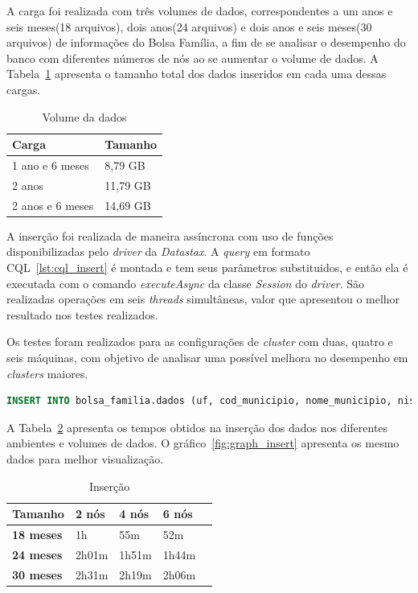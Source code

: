 A carga foi realizada com três volumes de dados, correspondentes a um anos e seis meses(18 arquivos), dois anos(24 arquivos) e dois anos e seis meses(30 arquivos) de informações do Bolsa Família, a fim de se analisar o desempenho do banco com diferentes números de nós ao se aumentar o volume de dados. A Tabela~\ref{tab:volume} apresenta o tamanho total dos dados inseridos em cada uma dessas cargas.

\begin{table}[]
	\centering
	\caption{Volume da dados}
	\label{tab:volume}
	\begin{tabular}{ll}
		\textbf{Carga} & \textbf{Tamanho} \\ \hline
		1 ano e 6 meses     &  8,79 GB              \\ \hline
		2 anos          	&  11,79 GB             \\ \hline
		2 anos e 6 meses    &  14,69 GB             \\ \hline
	\end{tabular}
\end{table}

A inserção foi realizada de maneira assíncrona com uso de funções disponibilizadas pelo \emph{driver} da \emph{Datastax}. A \emph{query} em formato CQL~\ref{lst:cql_insert} é montada e tem seus parâmetros substituidos, e então ela é executada com o comando \emph{executeAsync} da classe \emph{Session} do \emph{driver}. São realizadas operações em seis \emph{threads} simultâneas, valor que apresentou o melhor resultado nos testes realizados.

Os testes foram realizados para as configurações de \emph{cluster} com duas, quatro e seis máquinas, com objetivo de analisar uma possível melhora no desempenho em \emph{clusters} maiores.

\begin{lstlisting}[caption={Código CQL para inserção},label={lst:cql_insert},language=SQL]
INSERT INTO bolsa_familia.dados (uf, cod_municipio, nome_municipio, nis_favorecido, nome_favorecido, fonte, valor, periodo) VALUES (?, ?, ?, ?, ?, ?, ?, ?)
\end{lstlisting}

A Tabela~\ref{tb_insert} apresenta os tempos obtidos na inserção dos dados nos diferentes ambientes e volumes de dados. O gráfico~\ref{fig:graph_insert} apresenta os mesmo dados para melhor visualização.


\begin{table}[]
	\centering
	\caption{Inserção}
	\label{tb_insert}
	\begin{tabular}{lllll}
		\textbf{Tamanho}	& \textbf{2 nós} & \textbf{4 nós} & \textbf{6 nós} \\ \hline
		\textbf{18 meses}   	& 1h         	 & 55m       	  & 52m            \\ \hline
		\textbf{24 meses}      & 2h01m          & 1h51m          & 1h44m          \\ \hline
		\textbf{30 meses}     & 2h31m      	 & 2h19m          & 2h06m          \\ \hline
	\end{tabular}
\end{table}

